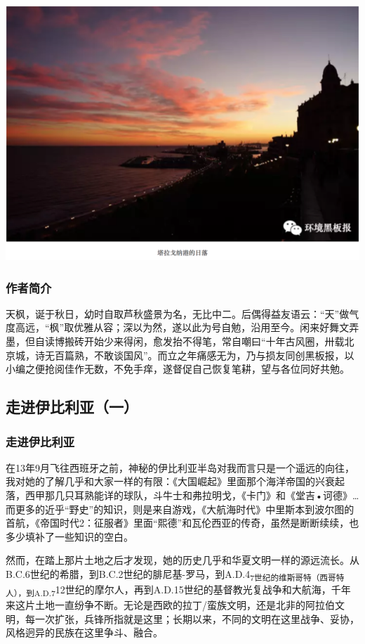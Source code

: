 \documentclass[]{book}
\begin{document}
\includegraphics[width=8.33in]{images/xt7}

\subsubsection{作者简介}\label{-1}

天枫，诞于秋日，幼时自取芦秋盛景为名，无比中二。后偶得益友语云：``天''做气度高远，``枫''取优雅从容；深以为然，遂以此为号自勉，沿用至今。闲来好舞文弄墨，但自读博搬砖开始少来得闲，愈发抬不得笔，常自嘲曰``十年古风圈，卅载北京城，诗无百篇熟，不敢谈国风''。而立之年痛感无为，乃与损友同创黑板报，以小编之便抢阅佳作无数，不免手痒，遂督促自己恢复笔耕，望与各位同好共勉。

\subsection{走进伊比利亚（一）}

\subsubsection{走进伊比利亚}

在13年9月飞往西班牙之前，神秘的伊比利亚半岛对我而言只是一个遥远的向往，我对她的了解几乎和大家一样的有限：《大国崛起》里面那个海洋帝国的兴衰起落，西甲那几只耳熟能详的球队，斗牛士和弗拉明戈，《卡门》和《堂吉•诃德》\ldots{}而更多的近乎``野史''的知识，则是来自游戏，《大航海时代》中里斯本到波尔图的首航，《帝国时代2：征服者》里面``熙德''和瓦伦西亚的传奇，虽然是断断续续，也多少填补了一些知识的空白。

然而，在踏上那片土地之后才发现，她的历史几乎和华夏文明一样的源远流长。从B.C.6世纪的希腊，到B.C.2世纪的腓尼基-罗马，到A.D.4\textsubscript{7世纪的维斯哥特（西哥特人），到A.D.7}12世纪的摩尔人，再到A.D.15世纪的基督教光复战争和大航海，千年来这片土地一直纷争不断。无论是西欧的拉丁/蛮族文明，还是北非的阿拉伯文明，每一次扩张，兵锋所指就是这里；长期以来，不同的文明在这里战争、妥协，风格迥异的民族在这里争斗、融合。
\end{document}

